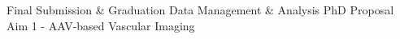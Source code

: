 {\begin{tabularx}{\linewidth}{|l!{\vrule width \myLenLineThicknessThick}*{7}{@{}X@{}|}}
       & 
    
      
      
       & 
    
      
      
       & 
    
      
      
       & 
    
      
      
      
        \\  \hline 
      
    
  
  
  \end{tabularx}
}
\vfill{\centering{} \small{Final Submission \& Graduation}\hspace{1.5em} \small{Data Management \& Analysis}\hspace{1.5em} \small{PhD Proposal}\hspace{1.5em} \small{Aim 1 - AAV-based Vascular Imaging}\hspace{1.5em}\par}

